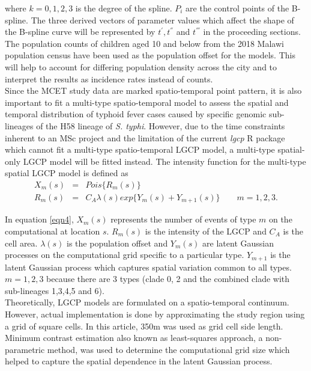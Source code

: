\documentclass[12pt,a4paper]{report}
\begin{document}
where $k = 0,1,2,3$ is the degree of the spline. $P_i$ are the control points of the B-spline. The three derived vectors of parameter values which affect the shape of the B-spline curve will be represented by $t^{'}, t^{''}$ and $t^{'''}$ in the proceeding sections. The population counts of children aged 10 and below from the 2018 Malawi population census have been used as the population offset for the models. This will help to account for differing population density across the city and to interpret the results as incidence rates  instead of counts.\\

Since the MCET study data are marked spatio-temporal point pattern, it is also important to fit a multi-type spatio-temporal model to assess the spatial and temporal distribution of typhoid fever cases caused by specific genomic sub-lineages of the H58 lineage of \textit{S. typhi}. However, due to the time constraints inherent to an MSc project and the limitation of the current \textit{lgcp} R package which cannot fit a multi-type spatio-temporal LGCP model, a multi-type spatial-only LGCP model will be fitted instead. The intensity function for the multi-type spatial LGCP model is defined as 
\begin{eqnarray} \label{eqn4}
X_m(s) &=& Pois \lbrace R_m(s)\rbrace \nonumber \\
R_m(s) &=& C_A \lambda(s) exp \lbrace Y_m(s) + Y_{m+1}(s)\rbrace \quad \quad m =  1,2,3.
\end{eqnarray}

In equation \ref{eqn4}, $X_m(s)$ represents the number of events of type $m$ on the computational at location $s$. $R_m(s)$ is the intensity of the LGCP and $C_A$ is the cell area. $\lambda(s)$ is the population offset and $Y_m(s)$ are latent Gaussian processes on the computational grid specific to a particular type. $Y_{m+1}$ is the latent Gaussian process which captures spatial variation common to all types. $m=1,2,3$ because there are 3 types (clade 0, 2 and the combined clade with sub-lineages 1,3,4,5 and 6).\\

Theoretically, LGCP models are formulated on a spatio-temporal continuum. However, actual implementation is done by approximating the study region using a grid of square cells. In this article, 350m was used as grid cell side length. Minimum contrast estimation also known as least-squares approach, a non-parametric method, was used to determine the computational grid size which helped to capture the spatial dependence in the latent Gaussian process.\cite{Moller} \cite{Davies2013}
\end{document}
